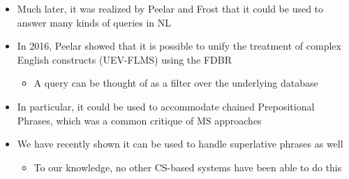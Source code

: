 \documentclass[logoontitle,tabu,supertabular,aspectratio=43]{preney-uwindsor-beamer}
\begin{document}
	\begin{frame}{\insertsection}
		\begin{itemize}
			\item Much later, it was realized by Peelar and Frost that it could be used to answer many kinds of queries in NL
			\item In 2016, Peelar showed that it is possible to unify the treatment of complex English constructs (UEV-FLMS) using the FDBR \cite{peelar2016accommodating}
			\begin{itemize}
				\item A query can be thought of as a filter over the underlying database
			\end{itemize}
			\item In particular, it could be used to accommodate chained Prepositional Phrases, which was a common critique of MS approaches
			\item We have recently shown it can be used to handle superlative phrases as well
			\begin{itemize}
				\item To our knowledge, no other CS-based systems have been able to do this
			\end{itemize}
		\end{itemize}
	\end{frame}
\end{document}
